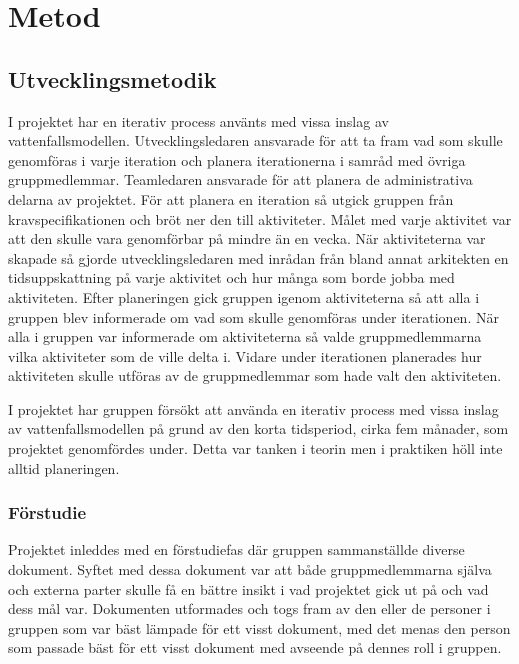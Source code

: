 \chapter{Metod}
\label{cha:method}

\section{Utvecklingsmetodik}

I projektet har en iterativ process använts med vissa inslag av vattenfallsmodellen. Utvecklingsledaren ansvarade för att ta fram vad som skulle genomföras i varje iteration och planera iterationerna i samråd med övriga gruppmedlemmar. Teamledaren ansvarade för att planera de administrativa delarna av projektet. För att planera en iteration så utgick gruppen från kravspecifikationen och bröt ner den till aktiviteter. Målet med varje aktivitet var att den skulle vara genomförbar på mindre än en vecka. När aktiviteterna var skapade så gjorde utvecklingsledaren med inrådan från bland annat arkitekten en tidsuppskattning på varje aktivitet och hur många som borde jobba med aktiviteten. Efter planeringen gick gruppen igenom aktiviteterna så att alla i gruppen blev informerade om vad som skulle genomföras under iterationen. När alla i gruppen var informerade om aktiviteterna så valde gruppmedlemmarna vilka aktiviteter som de ville delta i. Vidare under iterationen planerades hur aktiviteten skulle utföras av de gruppmedlemmar som hade valt den aktiviteten.

I projektet har gruppen försökt att använda en iterativ process med vissa inslag av vattenfallsmodellen på grund av den korta tidsperiod, cirka fem månader, som projektet genomfördes under.
Detta var tanken i teorin men i praktiken höll inte alltid planeringen.

\subsection{Förstudie}

Projektet inleddes med en förstudiefas där gruppen sammanställde diverse dokument. Syftet med dessa dokument var att både gruppmedlemmarna själva och externa parter skulle få en bättre insikt i vad projektet gick ut på och vad dess mål var. Dokumenten utformades och togs fram av den eller de personer i gruppen som var bäst lämpade för ett visst dokument, med det menas den person som passade bäst för ett visst dokument med avseende på dennes roll i gruppen.

